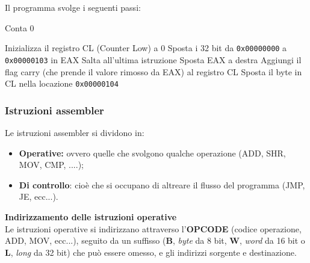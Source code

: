 \documentclass[a4paper,11pt]{article}
\begin{document}
Il programma svolge i seguenti passi:
\begin{algorithm}
\caption{Conta 0}
\begin{algorithmic}
	\STATE Inizializza il registro CL (Counter Low) a 0
	\STATE Sposta i 32 bit da \lstinline|0x00000000| a \lstinline|0x00000103| in EAX
			\STATE Salta all'ultima istruzione
		\ENDIF
		\STATE Sposta EAX a destra
		\STATE Aggiungi il flag carry (che prende il valore rimosso da EAX) al registro CL
	\ENDWHILE
	\STATE Sposta il byte in CL nella locazione \lstinline|0x00000104|
\end{algorithmic}
\end{algorithm}

\subsubsection{Istruzioni assembler}
Le istruzioni assembler si dividono in:
\begin{itemize}
	\item \textbf{Operative:} ovvero quelle che svolgono qualche operazione (ADD, SHR, MOV, CMP, ....);
	\item \textbf{Di controllo}: cioè che si occupano di altreare il flusso del programma (JMP, JE, ecc...).
\end{itemize}

\par\medskip
\noindent
\textsf{\textbf{Indirizzamento delle istruzioni operative}} \\
Le istruzioni operative si indirizzano attraverso l'\textbf{OPCODE} (codice operazione, ADD, MOV, ecc...), seguito da un suffisso (\textbf{B}, \textit{byte} da 8 bit, \textbf{W}, \textit{word} da 16 bit o \textbf{L}, \textit{long} da 32 bit) che può essere omesso, e gli indirizzi sorgente e destinazione.
\end{document}
